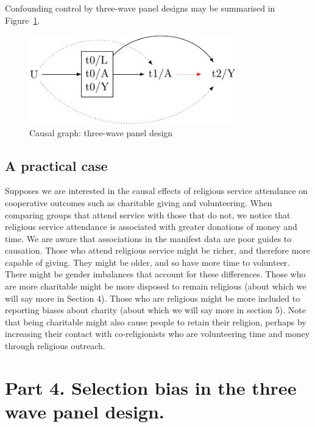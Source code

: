 \documentclass[
  singlecolumn]{report}
\begin{document}
Confounding control by three-wave panel designs may be summarised in
Figure~\ref{fig-dag-6}.

\begin{figure}

{\centering \includegraphics[width=0.8\textwidth,height=\textheight]{causal-dags_files/figure-pdf/fig-dag-6-1.pdf}

}

\caption{\label{fig-dag-6}Causal graph: three-wave panel design}

\end{figure}

\hypertarget{a-practical-case}{%
\subsection{A practical case}\label{a-practical-case}}

Supposes we are interested in the causal effects of religious service
attendance on cooperative outcomes such as charitable giving and
volunteering. When comparing groups that attend service with those that
do not, we notice that religious service attendance is associated with
greater donations of money and time. We are aware that associations in
the manifest data are poor guides to causation. Those who attend
religious service might be richer, and therefore more capable of giving.
They might be older, and so have more time to volunteer. There might be
gender imbalances that account for these differences. Those who are more
charitable might be more disposed to remain religious (about which we
will say more in Section 4). Those who are religious might be more
included to reporting biases about charity (about which we will say more
in section 5). Note that being charitable might also cause people to
retain their religion, perhaps by increasing their contact with
co-religionists who are volunteering time and money through religious
outreach.

\hypertarget{part-4.-selection-bias-in-the-three-wave-panel-design.}{%
\section{Part 4. Selection bias in the three wave panel
design.}\label{part-4.-selection-bias-in-the-three-wave-panel-design.}}
\end{document}
